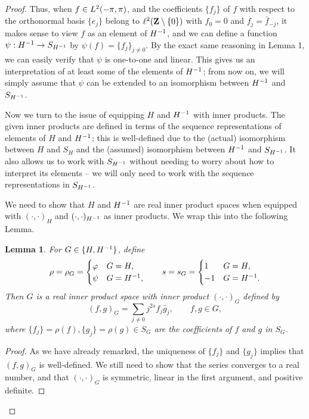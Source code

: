 \documentclass{homework}
\newtheorem{lemma}{Lemma}
\begin{document}
\begin{arabicparts}
\begin{proof}
		Thus, when $f\in{L^2(-\pi,\pi)}$, and the coefficients $\{f_j\}$ of $f$ with respect to the orthonormal basis $\{e_j\}$ belong to $\ell^2(\textbf{Z}\setminus\{0\})$ with $f_0 =0$ and $f_j = \bar{f}_{-j}$, it makes sense to view $f$ as an element of ${H^{-1}}$, and we can define a function $\psi: {H^{-1}} \to S_{H^{-1}}$ by $\psi(f) = \{f_j\}_{j\ne0}$. By the exact same reasoning in Lemma 1, we can easily verify that $\psi$ is one-to-one and linear. This gives us an interpretation of at least some of the elements of ${H^{-1}}$; from now on, we will simply assume that $\psi$ can be extended to an isomorphism between ${H^{-1}}$ and $S_{H^{-1}}$.
		
		Now we turn to the issue of equipping $H$ and ${H^{-1}}$ with inner products. The given inner products are defined in terms of the sequence representations of elements of $H$ and ${H^{-1}}$; this is well-defined due to the (actual) isomorphism between $H$ and $S_H$ and the (assumed) isomorphism between ${H^{-1}}$ and $S_{H^{-1}}$. It also allows us to work with $S_{H^{-1}}$ without needing to worry about how to interpret its elements -- we will only need to work with the sequence representations in $S_{H^{-1}}$.
		
		We need to show that $H$ and ${H^{-1}}$ are real inner product spaces when equipped with $(\cdot,\cdot)_H$ and $(\cdot,\cdot)_{H^{-1}}$ as inner products. We wrap this into the following Lemma.
		\begin{lemma}
			For $G \in \{H, {H^{-1}}\}$, define 
			\begin{equation}
				\rho = \rho_G = \begin{cases}
					\varphi & G = H, \\
					\psi & G = {H^{-1}},
				\end{cases}\qquad
				s = s_G = \begin{cases}
					1 & G = H, \\
					-1 & G = {H^{-1}}.
				\end{cases}
			\end{equation}
			Then $G$ is a real inner product space with inner product $(\cdot,\cdot)_G$ defined by
			\begin{equation}
				(f,g)_G = \sum_{j\ne0}j^{2s}f_j\bar{g}_j, \qquad f,g \in G,
			\end{equation}
			where $\{f_j\} = \rho(f), \{g_j\}=\rho(g) \in S_G$ are the coefficients of $f$ and $g$ in $S_G$.
		\end{lemma}
		\begin{proof}
			As we have already remarked, the uniqueness of $\{f_j\}$ and $\{g_j\}$ implies that $(f,g)_G$ is well-defined. We still need to show that the series converges to a real number, and that $(\cdot,\cdot)_G$ is symmetric, linear in the first argument, and positive definite.
			

\end{proof}
\end{proof}
\end{arabicparts}
\end{document}
